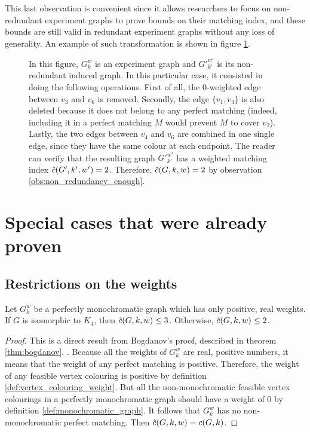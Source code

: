 This last observation is convenient since it allows researchers to focus on non-redundant experiment graphs to prove bounds on their matching index, and these bounds are still valid in redundant experiment graphs without any loss of generality. An example of such transformation is shown in figure \ref{fig:non_redundant_induced_graph}.

\begin{figure}[H]
    \caption{In this figure, $G_k^w$ is an experiment graph and ${G'}_{k'}^{w'}$ is its non-redundant induced graph. In this particular case, it consisted in doing the following operations. First of all, the $0$-weighted edge between $v_3$ and $v_6$ is removed. Secondly, the edge $\{v_1, v_3\}$ is also deleted because it does not belong to any perfect matching (indeed, including it in a perfect matching $M$ would prevent $M$ to cover $v_2$). Lastly, the two edges between $v_4$ and $v_6$ are combined in one single edge, since they have the same colour at each endpoint. The reader can verify that the resulting graph ${G'}_{k'}^{w'}$ has a weighted matching index $\Tilde{c}(G', k', w') = 2$. Therefore, $\Tilde{c}(G, k, w) = 2$ by observation \ref{obs:non_redundancy_enough}.}
    \label{fig:non_redundant_induced_graph}
\end{figure}


\section{Special cases that were already proven}

\subsection{Restrictions on the weights}

\begin{lemma}
    \label{lem:real_pos_weights}
    Let $G_k^w$ be a perfectly monochromatic graph which has only positive, real weights. If $G$ is isomorphic to $K_4$, then $\Tilde{c}(G, k, w) \leq 3$. Otherwise, $\Tilde{c}(G, k, w) \leq 2$.
\end{lemma}

\begin{proof}
    This is a direct result from Bogdanov's proof, described in theorem \ref{thm:bogdanov}. \cite{bogdanov}. Because all the weights of $G_k^w$ are real, positive numbers, it means that the weight of any perfect matching is positive. Therefore, the weight of any feasible vertex colouring is positive by definition \ref{def:vertex_colouring_weight}. But all the non-monochromatic feasible vertex colourings in a perfectly monochromatic graph should have a weight of 0 by definition \ref{def:monochromatic_graph}. It follows that $G_k^w$ has no non-monochromatic perfect matching. Then $\Tilde{c}(G, k, w) = c(G, k)$.
\end{proof}


